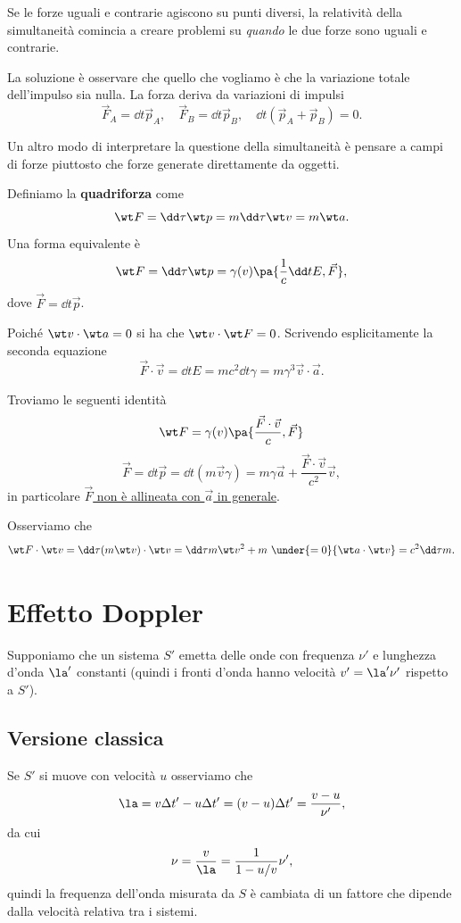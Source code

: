 \noindent Se le forze uguali e contrarie agiscono su punti diversi, la relativit\`a della simultaneit\`a comincia a creare problemi su \textit{quando} le due forze sono uguali e contrarie.\medskip

\noindent La soluzione \`e osservare che quello che vogliamo \`e che la variazione totale dell'impulso sia nulla. La forza deriva da variazioni di impulsi
\[\vec F_A=\dd t{\vec p_A},\quad \vec F_B=\dd t{\vec p_B},\quad \dd t{}(\vec p_A+\vec p_B)=0.\]
\bigskip

\noindent Un altro modo di interpretare la questione della simultaneit\`a \`e pensare a campi di forze piuttosto che forze generate direttamente da oggetti.

\begin{definition}[Quadriforza]
Definiamo la \textbf{quadriforza} come
\[\wt F=\dd \tau{\wt p}=m\dd\tau{\wt v}=m\wt a.\]
Una forma equivalente \`e 
\[\wt F=\dd \tau{\wt p}=\gamma(v)\pa{\frac1c\dd tE,\vec F},\]
dove $\vec F=\dd t{\vec p}$.
\end{definition}

\begin{remark}
Poich\'e $\wt v\cdot \wt a=0$ si ha che $\wt v\cdot\wt F=0$. Scrivendo esplicitamente la seconda equazione
\[\vec F\cdot \vec v=\dd tE=mc^2\dd t\gamma=m\gamma^3 \vec v\cdot \vec a.\]
\end{remark}

\begin{remark}
Troviamo le seguenti identit\`a
\[\wt F=\gamma(v)\pa{\frac{\vec F\cdot \vec v}c,\vec F}\]
\[\vec F=\dd t{\vec p}=\dd t{}(m\vec v\gamma)=m\gamma\vec a+\frac{\vec F\cdot \vec v}{c^2}\vec v,\]
in particolare \underline{$\vec F$ non \`e allineata con $\vec a$ in generale}.
\end{remark}

\begin{remark}
Osserviamo che
\[\wt F\cdot \wt v=\dd\tau{}(m\wt v)\cdot \wt v=\dd\tau m\wt v^2+m\ \under{=0}{\wt a\cdot \wt v}=c^2\dd\tau m.\]
\end{remark}

\section{Effetto Doppler}
Supponiamo che un sistema $S'$ emetta delle onde con frequenza $\nu'$ e lunghezza d'onda $\la'$ constanti (quindi i fronti d'onda hanno velocit\`a $v'=\la'\nu'$ rispetto a $S'$).

\subsection{Versione classica}
Se $S'$ si muove con velocit\`a $u$ osserviamo che
\[\la=v\Delta t'-u\Delta t'=(v-u)\Delta t'=\frac{v-u}{\nu'},\]
da cui
\[\nu=\frac v\la=\frac1{1-u/v}\nu',\]
quindi la frequenza dell'onda misurata da $S$ \`e cambiata di un fattore che dipende dalla velocit\`a relativa tra i sistemi.\medskip

